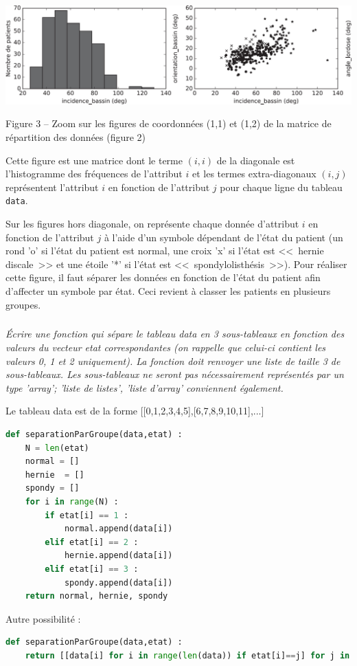 \begin{center}
\includegraphics[width=.8\textwidth]{images/fig_03}

Figure 3 -- Zoom sur les figures de coordonnées (1,1) et (1,2) de la matrice de répartition des données
(figure 2)
\end{center}


Cette figure est une matrice dont le terme $(i, i)$ de la diagonale est l’histogramme des fréquences de
l’attribut $i$ et les termes extra-diagonaux $(i, j)$ représentent l’attribut $i$ en fonction de l’attribut $j$ pour
chaque ligne du tableau \texttt{data}.

Sur les figures hors diagonale, on représente chaque donnée d’attribut $i$ en fonction de l’attribut $j$ à
l’aide d’un symbole dépendant de l’état du patient (un rond ’o’ si l’état du patient est normal, une
croix ’x’ si l’état est <<~hernie discale~>> et une étoile ’*’ si l’état est <<~spondylolisthésis~>>).
Pour réaliser cette figure, il faut séparer les données en fonction de l’état du patient afin d’affecter un
symbole par état. Ceci revient à classer les patients en plusieurs groupes.

\fi

\subparagraph{}\textit{Écrire une fonction  qui sépare le tableau data en
3 sous-tableaux en fonction des valeurs du vecteur etat correspondantes (on rappelle que
celui-ci contient les valeurs 0, 1 et 2 uniquement). La fonction doit renvoyer une liste de
taille 3 de sous-tableaux. Les sous-tableaux ne seront pas nécessairement représentés par un
type ’array’; ’liste de listes’, ’liste d’array’ conviennent également.}
\ifprof
\begin{corrige}
Le tableau data est de la forme [[0,1,2,3,4,5],[6,7,8,9,10,11],...]
\begin{lstlisting}[language=Python]
def separationParGroupe(data,etat) :
    N = len(etat)
    normal = []
    hernie  = []
    spondy = []
    for i in range(N) :
        if etat[i] == 1 :
            normal.append(data[i])
        elif etat[i] == 2 :
            hernie.append(data[i])
        elif etat[i] == 3 :
        	spondy.append(data[i])
    return normal, hernie, spondy
\end{lstlisting}

Autre possibilité : 
\begin{lstlisting}[language=Python]
def separationParGroupe(data,etat) :
    return [[data[i] for i in range(len(data)) if etat[i]==j] for j in range(3)]
\end{lstlisting}

\end{corrige}
\else
\fi


